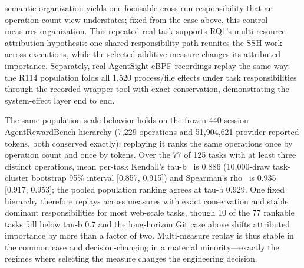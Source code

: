 \documentclass[letterpaper]{article}
\begin{document}
semantic organization yields one focusable cross-run responsibility that an
operation-count view understates; fixed from the case above, this control
measures organization.
This repeated real task supports RQ1's multi-resource attribution hypothesis:
one shared responsibility path reunites the SSH work across executions, while
the selected additive measure changes its attributed importance.
Separately, real AgentSight eBPF recordings replay the same way: the R114
population folds all 1{,}520 process/file effects under task responsibilities
through the recorded wrapper tool with exact conservation, demonstrating the
system-effect layer end to end.

The same population-scale behavior holds on the frozen 440-session
AgentRewardBench hierarchy (7{,}229 operations and 51{,}904{,}621
provider-reported tokens, both conserved exactly): replaying it ranks the same
operations once by operation count and once by tokens. Over the 77 of 125 tasks
with at least three distinct operations, mean per-task Kendall's
tau-b~\cite{kendall1938} is 0.886 (10{,}000-draw task-cluster bootstrap 95\%
interval [0.857, 0.915]) and Spearman's rho~\cite{spearman1904} is 0.935
[0.917, 0.953]; the pooled population ranking agrees at tau-b 0.929. One fixed
hierarchy therefore replays across measures with exact conservation and stable
dominant responsibilities for most web-scale tasks, though 10 of the 77
rankable tasks fall below tau-b 0.7 and the long-horizon Git case above shifts
attributed importance by more than a factor of two. Multi-measure replay is
thus stable in the common case and decision-changing in a material
minority---exactly the regimes where selecting the measure changes the
engineering decision.
\end{document}
